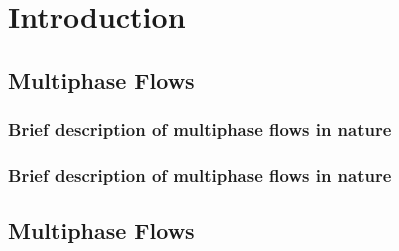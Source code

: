 \setchapterpreamble[u]{\margintoc}
\chapter{Introduction}

\section{Multiphase Flows}

\subsection{Brief description of multiphase flows in nature}
\blindtext

\subsection{Brief description of multiphase flows in nature}
\blindtext

\section{Multiphase Flows}

\blindtext

